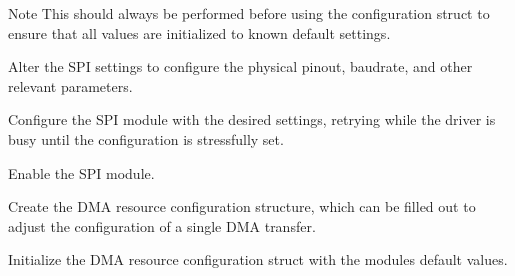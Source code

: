 \begin{DoxyEnumerate}
\begin{DoxyCodeInclude}{0}
\end{DoxyCodeInclude}
 \begin{DoxyNote}{Note}
This should always be performed before using the configuration struct to ensure that all values are initialized to known default settings.
\end{DoxyNote}

\item Alter the S\+PI settings to configure the physical pinout, baudrate, and other relevant parameters. 
\begin{DoxyCodeInclude}{0}
\end{DoxyCodeInclude}
 
\begin{DoxyCodeInclude}{0}
\end{DoxyCodeInclude}

\item Configure the S\+PI module with the desired settings, retrying while the driver is busy until the configuration is stressfully set. 
\begin{DoxyCodeInclude}{0}
\end{DoxyCodeInclude}
 
\begin{DoxyCodeInclude}{0}
\end{DoxyCodeInclude}

\item Enable the S\+PI module. 
\begin{DoxyCodeInclude}{0}
\end{DoxyCodeInclude}
 
\begin{DoxyCodeInclude}{0}
\end{DoxyCodeInclude}

\item Create the D\+MA resource configuration structure, which can be filled out to adjust the configuration of a single D\+MA transfer. 
\begin{DoxyCodeInclude}{0}
\end{DoxyCodeInclude}
 
\begin{DoxyCodeInclude}{0}
\end{DoxyCodeInclude}

\item Initialize the D\+MA resource configuration struct with the module\textquotesingle{}s default values. 
\begin{DoxyCodeInclude}{0}
\end{DoxyCodeInclude}
 

\end{DoxyEnumerate}
